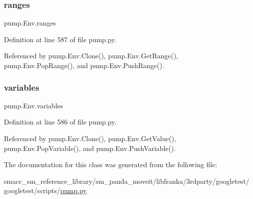 \subsubsection{\texorpdfstring{ranges}{ranges}}
{\footnotesize\ttfamily pump.\+Env.\+ranges}



Definition at line 587 of file pump.\+py.



Referenced by pump.\+Env.\+Clone(), pump.\+Env.\+Get\+Range(), pump.\+Env.\+Pop\+Range(), and pump.\+Env.\+Push\+Range().

\mbox{\label{classpump_1_1Env_aba6456f3d0d23ac92bc9508c1b966bcd}} 
\subsubsection{\texorpdfstring{variables}{variables}}
{\footnotesize\ttfamily pump.\+Env.\+variables}



Definition at line 586 of file pump.\+py.



Referenced by pump.\+Env.\+Clone(), pump.\+Env.\+Get\+Value(), pump.\+Env.\+Pop\+Variable(), and pump.\+Env.\+Push\+Variable().



The documentation for this class was generated from the following file\+:\begin{DoxyCompactItemize}
\item 
smacc\+\_\+sm\+\_\+reference\+\_\+library/sm\+\_\+panda\+\_\+moveit/libfranka/3rdparty/googletest/googletest/scripts/\hyperlink{pump_8py}{pump.\+py}\end{DoxyCompactItemize}
